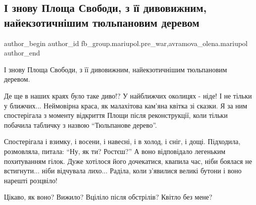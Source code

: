  
 
 
 
 

\subsection{І знову Площа Свободи, з її дивовижним, найекзотичнішим тюльпановим деревом}
\label{sec:05_02_2023.fb.fb_group.mariupol.pre_war.5.__znovu_ploshcha_svo}
 
\ifcmt
 author_begin
   author_id fb_group.mariupol.pre_war,avramova_olena.mariupol
 author_end
\fi

І знову Площа Свободи, з її дивовижним, найекзотичнішим тюльпановим деревом. 

Де ще в наших краях було таке диво!? У найближчих околицях - ніде! І не тільки
у ближчих...  Неймовірна краса, як малахітова кам'яна квітка зі сказки. Я за
ним спостерігала з моменту відкриття Площи після реконструкції, коли тільки
побачила табличку з назвою \enquote{Тюльпанове дерево}.

Спостерігала і взимку, і восени, і навесні, і в холод, і сніг, і дощі.
Підходила, розмовляла, питала: \enquote{Ну, як ти? Ростєш?}  А воно відповідало
легеньким похитуванням гілок. Дуже хотілося його дочекатися, квапила час, ніби
боялася не встигнути... ніби відчувала лихо... Раділа, коли з'явилися великі
бутони і воно нарешті розцвіло! 

Цікаво, як воно? Вижило? Вціліло після обстрілів? Квітло без мене?
